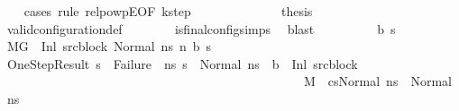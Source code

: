 \begin{isabellebody}
\ \ \isamarkupfalse%
\ {\isacharparenleft}{\kern0pt}cases\ rule{\isacharcolon}{\kern0pt}\ relpowp{\isacharunderscore}{\kern0pt}E{}{\isacharunderscore}{\kern0pt}{}{\isacharbrackleft}{\kern0pt}OF\ k{\isacharunderscore}{\kern0pt}step{\isacharbrackright}{\kern0pt}{\isacharparenright}{\kern0pt}\isanewline
\ \ \ \ \isamarkupfalse%
\ {}\isanewline
\ \ \ \ \isamarkupfalse%
\ \isamarkupfalse%
\ {\isacharquery}{\kern0pt}thesis\ \isanewline
\ \ \ \ \ \ \isamarkupfalse%
\ valid{\isacharunderscore}{\kern0pt}configuration{\isacharunderscore}{\kern0pt}def\isanewline
\ \ \ \ \ \ \isamarkupfalse%
\ is{\isacharunderscore}{\kern0pt}final{\isacharunderscore}{\kern0pt}config{\isachardot}{\kern0pt}simps{\isacharparenleft}{\kern0pt}{}{\isacharparenright}{\kern0pt}\ \isamarkupfalse%
\ blast\isanewline
\ \ \isamarkupfalse%
\isanewline
\ \ \ \ \isamarkupfalse%
\ {\isacharparenleft}{\kern0pt}{}\ b\ s{}{\isacharparenright}{\kern0pt}\isanewline
\ \ \ \ \isamarkupfalse%
\ {\isacartoucheopen}M{\isacharcomma}{\kern0pt}{\isasymLambda}{\isacharcomma}{\kern0pt}{\isasymGamma}{\isacharcomma}{\kern0pt}{\isasymOmega}{\isacharcomma}{\kern0pt}G\ {\isasymturnstile}\ {\isacharparenleft}{\kern0pt}Inl\ src{\isacharunderscore}{\kern0pt}block{\isacharunderscore}{\kern0pt}{}{\isacharcomma}{\kern0pt}\ Normal\ ns{\isacharparenright}{\kern0pt}\ {\isacharminus}{\kern0pt}n{\isasymrightarrow}\ {\isacharparenleft}{\kern0pt}b{\isacharcomma}{\kern0pt}\ s{}{\isacharparenright}{\kern0pt}{\isacartoucheclose}\isanewline
\ \ \ \ \isamarkupfalse%
\ OneStepResult{\isacharcolon}{\kern0pt}\ {\isachardoublequoteopen}s{}\ {\isasymnoteq}\ Failure\ {\isasymand}\ {\isacharparenleft}{\kern0pt}{\isasymforall}ns{}{\isachardot}{\kern0pt}\ {\isacharparenleft}{\kern0pt}s{}\ {\isacharequal}{\kern0pt}\ Normal\ ns{}\ {\isasymlongrightarrow}\ b\ {\isacharequal}{\kern0pt}\ Inl\ src{\isacharunderscore}{\kern0pt}block{\isacharunderscore}{\kern0pt}{}\ {\isasymand}\ \isanewline
\ \ \ \ \ \ \ \ \ \ \ \ \ \ \ \ \ \ \ \ \ \ \ \ \ \ \ \ \ \ \ \ \ \ \ \ \ \ \ \ \ \ \ \ \ \ \ \ M{\isacharcomma}{\kern0pt}{\isasymLambda}{\isacharcomma}{\kern0pt}{\isasymGamma}{\isacharcomma}{\kern0pt}{\isasymOmega}\ {\isasymturnstile}\ {\isasymlangle}cs{\isacharcomma}{\kern0pt}Normal\ ns{\isasymrangle}\ {\isacharbrackleft}{\kern0pt}{\isasymrightarrow}{\isacharbrackright}{\kern0pt}\ Normal\ ns{}{\isacharparenright}{\kern0pt}{\isacharparenright}{\kern0pt}{\isachardoublequoteclose}\isanewline

\end{isabellebody}
